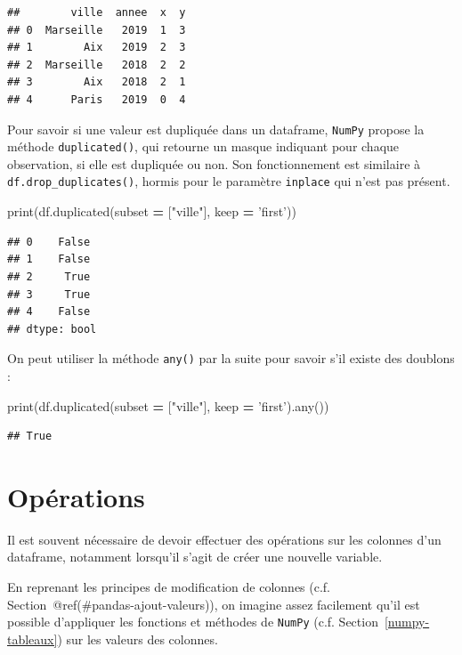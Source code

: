 \documentclass[12pt,]{book}
\newenvironment{Shaded}{\begin{snugshade}}{\end{snugshade}}
\newcommand{\StringTok}[1]{\textcolor[rgb]{0.31,0.60,0.02}{#1}}
\newcommand{\OperatorTok}[1]{\textcolor[rgb]{0.81,0.36,0.00}{\textbf{#1}}}
\newcommand{\BuiltInTok}[1]{#1}
\newcommand{\NormalTok}[1]{#1}
\numberwithin{equation}{section}
\numberwithin{countremarque}{section}
\begin{document}
\begin{lstlisting}
##        ville  annee  x  y
## 0  Marseille   2019  1  3
## 1        Aix   2019  2  3
## 2  Marseille   2018  2  2
## 3        Aix   2018  2  1
## 4      Paris   2019  0  4
\end{lstlisting}

Pour savoir si une valeur est dupliquée dans un dataframe,
\texttt{NumPy} propose la méthode \texttt{duplicated()}, qui retourne un
masque indiquant pour chaque observation, si elle est dupliquée ou non.
Son fonctionnement est similaire à \texttt{df.drop\_duplicates()},
hormis pour le paramètre \texttt{inplace} qui n'est pas présent.

\begin{Shaded}
\begin{Highlighting}[]
\BuiltInTok{print}\NormalTok{(df.duplicated(subset }\OperatorTok{=}\NormalTok{ [}\StringTok{"ville"}\NormalTok{], keep }\OperatorTok{=} \StringTok{'first'}\NormalTok{))}
\end{Highlighting}
\end{Shaded}

\begin{lstlisting}
## 0    False
## 1    False
## 2     True
## 3     True
## 4    False
## dtype: bool
\end{lstlisting}

On peut utiliser la méthode \texttt{any()} par la suite pour savoir s'il
existe des doublons :

\begin{Shaded}
\begin{Highlighting}[]
\BuiltInTok{print}\NormalTok{(df.duplicated(subset }\OperatorTok{=}\NormalTok{ [}\StringTok{"ville"}\NormalTok{], keep }\OperatorTok{=} \StringTok{'first'}\NormalTok{).}\BuiltInTok{any}\NormalTok{())}
\end{Highlighting}
\end{Shaded}

\begin{lstlisting}
## True
\end{lstlisting}

\section{Opérations}\label{operations}

Il est souvent nécessaire de devoir effectuer des opérations sur les
colonnes d'un dataframe, notamment lorsqu'il s'agit de créer une
nouvelle variable.

En reprenant les principes de modification de colonnes (c.f.
Section~@ref(\#pandas-ajout-valeurs)), on imagine assez facilement qu'il
est possible d'appliquer les fonctions et méthodes de \texttt{NumPy}
(c.f. Section~\ref{numpy-tableaux}) sur les valeurs des colonnes.
\end{document}
